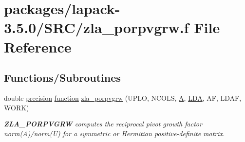 \hypertarget{zla__porpvgrw_8f}{}\section{packages/lapack-\/3.5.0/\+S\+R\+C/zla\+\_\+porpvgrw.f File Reference}
\label{zla__porpvgrw_8f}
\subsection*{Functions/\+Subroutines}
\begin{DoxyCompactItemize}
\item 
double \hyperlink{numinquire_8h_a2c8e616467665d0b2814d4c1589ba74e}{precision} \hyperlink{afunc_8m_a7b5e596df91eadea6c537c0825e894a7}{function} \hyperlink{group__complex16POcomputational_ga6596929bc0d4198ca7ee13e268df8c7d}{zla\+\_\+porpvgrw} (U\+P\+L\+O, N\+C\+O\+L\+S, \hyperlink{classA}{A}, \hyperlink{example__user_8c_ae946da542ce0db94dced19b2ecefd1aa}{L\+D\+A}, A\+F, L\+D\+A\+F, W\+O\+R\+K)
\begin{DoxyCompactList}\small\item\em {\bfseries Z\+L\+A\+\_\+\+P\+O\+R\+P\+V\+G\+R\+W} computes the reciprocal pivot growth factor norm(\+A)/norm(U) for a symmetric or Hermitian positive-\/definite matrix. \end{DoxyCompactList}\end{DoxyCompactItemize}
